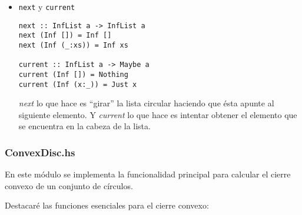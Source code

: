 \documentclass[12pt]{article}
\begin{document}
\begin{itemize}
\item \texttt{next} y \texttt{current}

  \begin{verbatim}
next :: InfList a -> InfList a
next (Inf []) = Inf []
next (Inf (_:xs)) = Inf xs

current :: InfList a -> Maybe a
current (Inf []) = Nothing
current (Inf (x:_)) = Just x
  \end{verbatim}
  
\textit{next} lo que hace es ``girar'' la lista circular haciendo que ésta apunte al siguiente elemento. Y \textit{current} lo que hace es intentar obtener el elemento que se encuentra en la cabeza de la lista.
  
\end{itemize}

\subsubsection*{ConvexDisc.hs}

En este módulo se implementa la funcionalidad principal para calcular el cierre convexo de un conjunto de círculos.

Destacaré las funciones esenciales para el cierre convexo:
\end{document}

